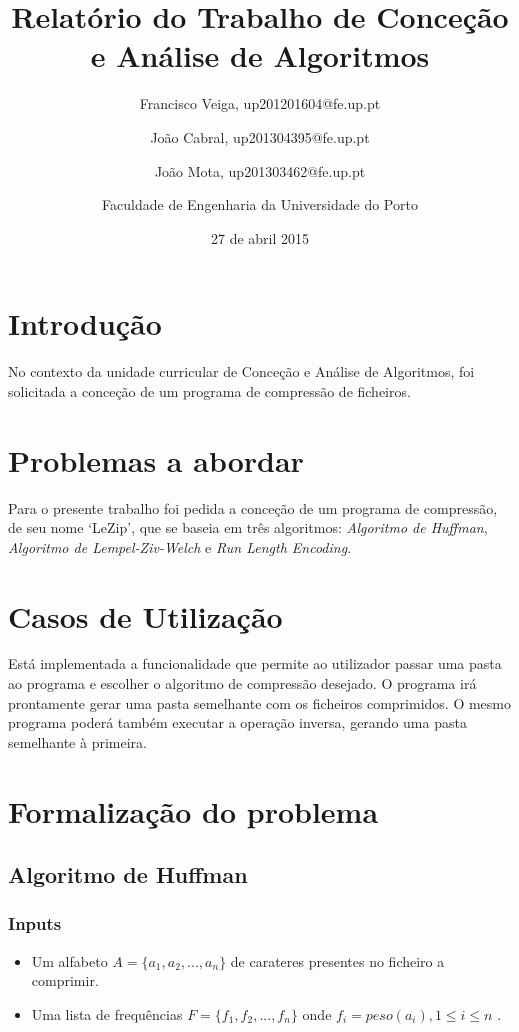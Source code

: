 \documentclass[a4paper,12pt,titlepage]{article}
\begin{document}
\title{Relatório do Trabalho de Conceção e Análise de Algoritmos}
\date{27 de abril 2015}
\author{Francisco Veiga, up201201604@fe.up.pt
 \and João Cabral, up201304395@fe.up.pt
 \and  João Mota, up201303462@fe.up.pt\linebreak
 \and Faculdade de Engenharia da Universidade do Porto}
%
\maketitle
\tableofcontents
\listoffigures
\listoftables
\newpage
\section{Introdução}

No contexto da unidade curricular de Conceção e Análise de Algoritmos, foi solicitada a conceção de um programa de compressão de ficheiros.

\section{Problemas a abordar} 
Para o presente trabalho foi pedida a conceção de um programa de compressão, de seu nome `LeZip', que se baseia em três algoritmos: \emph{Algoritmo de Huffman}, \emph{Algoritmo de Lempel-Ziv-Welch} e \emph{Run Length Encoding}.


\section{Casos de Utilização}
Está implementada a funcionalidade que permite ao utilizador passar uma pasta ao programa e escolher o algoritmo de compressão desejado. O programa irá prontamente gerar uma pasta semelhante com os ficheiros comprimidos. O mesmo programa poderá também executar a operação inversa, gerando uma pasta semelhante à primeira.

\newpage
\section{Formalização do problema}

\subsection{Algoritmo de Huffman}

\subsubsection*{Inputs}
\begin{itemize}
\item{Um alfabeto $A = \{a_1, a_2, ... , a_n\}$ de carateres presentes no ficheiro a comprimir.}
\item{Uma lista de frequências $F = \{f_1, f_2, ..., f_n\}$ onde $f_i = peso(a_i), 1 \leq i \leq n$ .}
\end{itemize}
\end{document}
